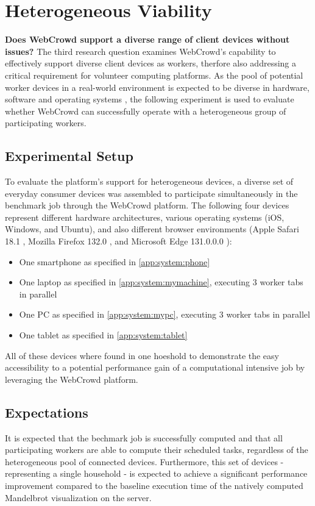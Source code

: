 \section{Heterogeneous Viability}
\label{sec:evaluation:heterogen}
\textbf{Does WebCrowd support a diverse range of client devices without issues?}
The third research question examines WebCrowd's capability to effectively support diverse client devices as workers, therfore also addressing a critical requirement for volunteer computing platforms. As the pool of potential worker devices in a real-world environment is expected to be diverse in hardware, software and operating systems \cite{intro:diverseDevices}, the following experiment is used to evaluate whether WebCrowd can successfully operate with a heterogeneous group of participating workers.

\subsection{Experimental Setup}
To evaluate the platform's support for heterogeneous devices, a diverse set of everyday consumer devices was assembled to participate simultaneously in the benchmark job through the WebCrowd platform. The following four devices represent different hardware architectures, various operating systems (iOS, Windows, and Ubuntu), and also different browser environments (Apple Safari 18.1 \cite{evaluation:safari}, Mozilla Firefox 132.0 \cite{background:firefox}, and Microsoft Edge 131.0.0.0 \cite{evaluation:edge}):
\begin{itemize}
    \item One smartphone as specified in \autoref{app:system:phone}
    \item One laptop as specified in \autoref{app:system:mymachine}, executing 3 worker tabs in parallel
    \item One \acs{PC} as specified in \autoref{app:system:mypc}, executing 3 worker tabs in parallel
    \item One tablet as specified in \autoref{app:system:tablet}
\end{itemize}
All of these devices where found in one hoeshold to demonstrate the easy accessibility to a potential performance gain of a computational intensive job by leveraging the WebCrowd platform.

\subsection{Expectations}
It is expected that the bechmark job is successfully computed and that all participating workers are able to compute their scheduled tasks, regardless of the heterogeneous pool of connected devices. Furthermore, this set of devices - representing a single household - is expected to achieve a significant performance improvement compared to the baseline execution time of the natively computed Mandelbrot visualization on the server.  

